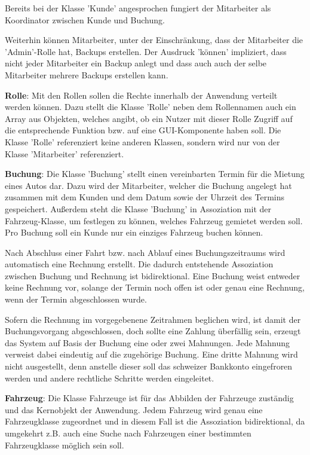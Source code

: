Bereits bei der Klasse 'Kunde' angesprochen fungiert der Mitarbeiter als Koordinator zwischen Kunde und Buchung. 

Weiterhin können Mitarbeiter, unter der Einschränkung, dass der Mitarbeiter die 'Admin'-Rolle hat, Backups erstellen. Der Ausdruck 'können' impliziert, dass nicht jeder Mitarbeiter ein Backup anlegt und dass auch auch der selbe Mitarbeiter mehrere Backups erstellen kann. 

\textbf{Rolle}: Mit den Rollen sollen die Rechte innerhalb der Anwendung verteilt werden können. Dazu stellt die Klasse 'Rolle' neben dem Rollennamen auch ein Array aus Objekten, welches angibt, ob ein Nutzer mit dieser Rolle Zugriff auf die entsprechende Funktion bzw. auf eine GUI-Komponente haben soll. Die Klasse 'Rolle' referenziert keine anderen Klassen, sondern wird nur von der Klasse 'Mitarbeiter' referenziert.

\textbf{Buchung}: Die Klasse 'Buchung' stellt einen vereinbarten Termin für die Mietung eines Autos dar. Dazu wird der Mitarbeiter, welcher die Buchung angelegt hat zusammen mit dem Kunden und dem Datum sowie der Uhrzeit des Termins gespeichert. Außerdem steht die Klasse 'Buchung' in Assoziation mit der Fahrzeug-Klasse, um festlegen zu können, welches Fahrzeug gemietet werden soll. Pro Buchung soll ein Kunde nur ein einziges Fahrzeug buchen können.

Nach Abschluss einer Fahrt bzw. nach Ablauf eines Buchungszeitraums wird automatisch eine Rechnung erstellt. Die dadurch entstehende Assoziation zwischen Buchung und Rechnung ist bidirektional. Eine Buchung weist entweder keine Rechnung vor, solange der Termin noch offen ist oder genau eine Rechnung, wenn der Termin abgeschlossen wurde.

Sofern die Rechnung im vorgegebenene Zeitrahmen beglichen wird, ist damit der Buchungsvorgang abgeschlossen, doch sollte eine Zahlung überfällig sein, erzeugt das System auf Basis der Buchung eine oder zwei Mahnungen. Jede Mahnung verweist dabei eindeutig auf die zugehörige Buchung. Eine dritte Mahnung wird nicht ausgestellt, denn anstelle dieser soll das schweizer Bankkonto eingefroren werden und andere rechtliche Schritte werden eingeleitet. 


\textbf{Fahrzeug}: Die Klasse Fahrzeuge ist für das Abbilden der Fahrzeuge zuständig und das Kernobjekt der Anwendung. Jedem Fahrzeug wird genau eine Fahrzeugklasse zugeordnet und in diesem Fall ist die Assoziation bidirektional, da umgekehrt z.B. auch eine Suche nach Fahrzeugen einer bestimmten Fahrzeugklasse möglich sein soll.

